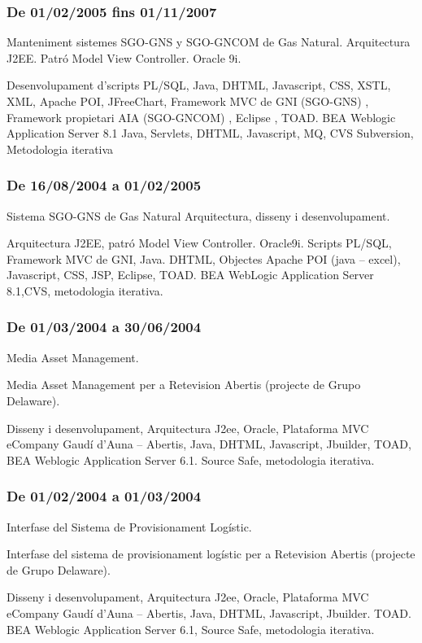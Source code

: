 \documentclass[11pt]{article}
\begin{document}
\subsubsection{De 01/02/2005 fins 01/11/2007}
\label{sec-5-1-4}

Manteniment sistemes SGO-GNS y SGO-GNCOM de Gas Natural. Arquitectura J2EE. Patró Model View Controller. Oracle 9i. 

Desenvolupament d’scripts PL/SQL, Java, DHTML, Javascript, CSS, XSTL, XML, Apache POI, JFreeChart, Framework MVC de GNI (SGO-GNS) , Framework propietari AIA (SGO-GNCOM) , Eclipse , TOAD. BEA Weblogic Application Server 8.1 Java, Servlets, DHTML, Javascript, MQ, CVS Subversion, Metodologia iterativa
\subsubsection{De 16/08/2004 a 01/02/2005}
\label{sec-5-1-5}

Sistema SGO-GNS de Gas Natural Arquitectura, disseny i desenvolupament.

Arquitectura J2EE, patró Model View Controller. Oracle9i. Scripts PL/SQL, Framework MVC de GNI, Java. DHTML, Objectes Apache POI (java – excel), Javascript, CSS, JSP, Eclipse, TOAD. BEA WebLogic Application Server 8.1,CVS, metodologia iterativa.
\subsubsection{De 01/03/2004 a 30/06/2004}
\label{sec-5-1-6}

Media Asset Management.

Media Asset Management per a Retevision Abertis (projecte de Grupo Delaware).

Disseny i desenvolupament, Arquitectura J2ee, Oracle, Plataforma MVC eCompany Gaudí d’Auna – Abertis, Java, DHTML, Javascript, Jbuilder, TOAD, BEA Weblogic Application Server 6.1. Source Safe, metodologia iterativa.
\subsubsection{De 01/02/2004 a 01/03/2004}
\label{sec-5-1-7}

Interfase del Sistema de Provisionament Logístic.

Interfase del sistema de provisionament logístic per a Retevision Abertis (projecte de Grupo Delaware).

Disseny i desenvolupament,  Arquitectura J2ee, Oracle, Plataforma MVC eCompany Gaudí d'Auna – Abertis, Java, DHTML, Javascript, Jbuilder. TOAD. BEA Weblogic Application Server 6.1, Source Safe, metodologia iterativa.
\end{document}
